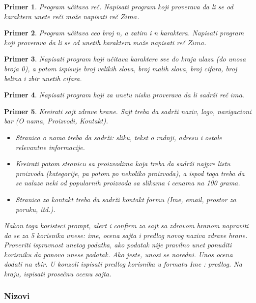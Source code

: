 \documentclass[a4paper]{article}
\newtheorem{primer}{Primer}[section]
\begin{document}
\begin{primer}
Program učitava reč. Napisati
program koji proverava da li se od karaktera unete reči može napisati reč $Zima$.
\end{primer}

\begin{primer}
Program učitava ceo broj n, a zatim i n karaktera. Napisati
program koji proverava da li se od unetih karaktera može napisati reč $Zima$.
\end{primer}

\begin{primer}
Napisati program koji učitava karaktere sve do kraja ulaza (do unosa broja 0), a potom ispisuje broj velikih slova, broj malih slova, broj cifara, broj belina i zbir unetih cifara. 
\end{primer}

\begin{primer}
Napisati program koji za unetu nisku proverava da li sadrži reč $ima$.
\end{primer}

\begin{primer}
Kreirati sajt zdrave hrane. Sajt treba da sadrži naziv, logo, navigacioni bar (O nama, Proizvodi, Kontakt). 
\begin{itemize}
    \item Stranica o nama treba da sadrži: sliku, tekst o radnji, adresu i ostale relevantne informacije. 
    \item Kreirati potom stranicu sa proizvodima koja treba da sadrži najpre listu proizvoda (kategorije, pa potom po nekoliko proizvoda), a ispod toga treba da se nalaze neki od popularnih proizvoda sa slikama i cenama na 100 grama. 
    \item Stranica za kontakt treba da sadrži kontakt formu (Ime, email, prostor za poruku, itd.).  
\end{itemize}

Nakon toga koristeci prompt, alert i confirm za sajt sa zdravom hranom napraviti da se za 5 korisnika unese: ime, ocena sajta i predlog novog naziva zdrave hrane. Proveriti ispravnost unetog podatka, ako podatak nije pravilno unet ponuditi korisniku da ponovo unese podatak. Ako jeste, unosi se naredni. Unos ocena dodati na zbir. U konzoli ispisati predlog korisnika u formatu Ime : predlog. Na kraju, ispisati prosečnu ocenu sajta.
\end{primer}

\subsubsection{Nizovi}
\end{document}
